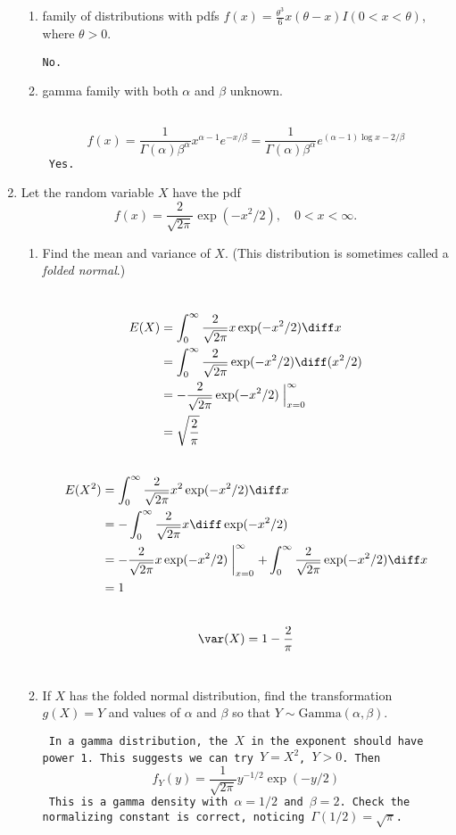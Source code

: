 \documentclass[12pt]{article}
\begin{document}
\begin{enumerate}
\begin{enumerate}
  \item family of distributions with
  pdfs $f(x) = \frac{\theta^3}{6}x(\theta-x)I(0 < x < \theta)$,
  where $\theta > 0$.

  \texttt{No.}

  \item gamma family with both $\alpha$ and $\beta$ unknown.

  \texttt{%
  \[
  f(x) = \frac{1}{\Gamma(\alpha) \beta^{\alpha}}
    x^{\alpha - 1} e^{-x/\beta}
    = \frac{1}{\Gamma(\alpha) \beta^{\alpha}}
        e^{(\alpha-1)\log x - 2/\beta}
  \]
  Yes.
  }

\end{enumerate}

\item
Let the random variable $X$ have the pdf
\[
f(x) = \frac{2}{\sqrt{2\pi}}\exp(-x^2/2),
\quad 0 < x < \infty.
\]
\begin{enumerate}
\item
Find the mean and variance of $X$.
(This distribution is sometimes called a {\em{folded normal}}.)

\texttt{%
\[\begin{split}
E(X)
&= \int_0^{\infty} \frac{2}{\sqrt{2\pi}} x \exp(-x^2/2) \diff x
\\
&= \int_0^{\infty} \frac{2}{\sqrt{2\pi}} \exp(-x^2/2) \diff (x^2/2)
\\
&= -\frac{2}{\sqrt{2\pi}} \exp(-x^2/2) \Bigm|_{x=0}^{\infty}
\\
&= \sqrt{\frac{2}{\pi}}
\end{split}
\]
\[\begin{split}
E(X^2)
&= \int_0^{\infty} \frac{2}{\sqrt{2\pi}} x^2 \exp(-x^2/2) \diff x
\\
&= - \int_0^{\infty} \frac{2}{\sqrt{2\pi}} x \diff \exp(-x^2/2)
\\
&= - \frac{2}{\sqrt{2\pi}} x \exp(-x^2/2) \biggm|_{x=0}^{\infty}
 + \int_0^{\infty} \frac{2}{\sqrt{2\pi}} \exp(-x^2/2) \diff x
\\
&= 1
\end{split}
\]
\[
\var(X) = 1 - \frac{2}{\pi}
\]
}

\item If $X$ has the folded normal distribution,
find the transformation $g(X)=Y$ and values of
$\alpha$ and $\beta$ so that $Y \sim \text{Gamma}(\alpha,\beta)$.

\texttt{%
In a gamma distribution,
the $X$ in the exponent should have power 1.
This suggests we can try $Y = X^2$, $Y > 0$.
Then
\[
f_Y(y)
= \frac{1}{\sqrt{2\pi}} y^{-1/2} \exp(-y/2)
\]
This is a gamma density with
$\alpha = 1/2$ and $\beta = 2$.
Check the normalizing constant is correct,
noticing $\Gamma(1/2) = \sqrt{\pi}$.
}
\end{enumerate}


\end{enumerate}
\end{document}
